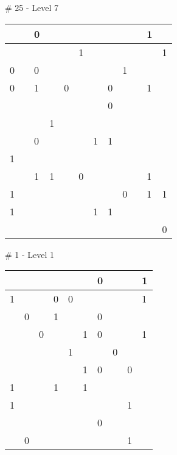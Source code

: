 \medskip

\# 25 - Level 7 \newline
\begin{tabular}{|m{\collen}|m{\collen}|m{\collen}|m{\collen}|m{\collen}|m{\collen}|m{\collen}|m{\collen}|m{\collen}|m{\collen}|m{\collen}|m{\collen}|}
\hline
    &   & 0 &   &   &   &   &   &   &   & 1 &   \\
\hline
    &   &   &   &   & 1 &   &   &   &   &   & 1 \\
\hline
  0 &   & 0 &   &   &   &   &   & 1 &   &   &   \\
\hline
  0 &   & 1 &   & 0 &   &   & 0 &   &   & 1 &   \\
\hline
    &   &   &   &   &   &   & 0 &   &   &   &   \\
\hline
    &   &   & 1 &   &   &   &   &   &   &   &   \\
\hline
    &   & 0 &   &   &   & 1 & 1 &   &   &   &   \\
\hline
  1 &   &   &   &   &   &   &   &   &   &   &   \\
\hline
    &   & 1 & 1 &   & 0 &   &   &   &   & 1 &   \\
\hline
  1 &   &   &   &   &   &   &   & 0 &   & 1 & 1 \\
\hline
  1 &   &   &   &   &   & 1 & 1 &   &   &   &   \\
\hline
    &   &   &   &   &   &   &   &   &   &   & 0 \\
\hline
\end{tabular}


\medskip

\# 1 - Level 1 \newline
\begin{tabular}{|m{\collen}|m{\collen}|m{\collen}|m{\collen}|m{\collen}|m{\collen}|m{\collen}|m{\collen}|m{\collen}|m{\collen}|}
\hline
    &   &   &   &   &   & 0 &   &   & 1 \\
\hline
  1 &   &   & 0 & 0 &   &   &   &   & 1 \\
\hline
    & 0 &   & 1 &   &   & 0 &   &   &   \\
\hline
    &   & 0 &   &   & 1 & 0 &   &   & 1 \\
\hline
    &   &   &   & 1 &   &   & 0 &   &   \\
\hline
    &   &   &   &   & 1 & 0 &   & 0 &   \\
\hline
  1 &   &   & 1 &   & 1 &   &   &   &   \\
\hline
  1 &   &   &   &   &   &   &   & 1 &   \\
\hline
    &   &   &   &   &   & 0 &   &   &   \\
\hline
    & 0 &   &   &   &   &   &   & 1 &   \\
\hline
\end{tabular}


